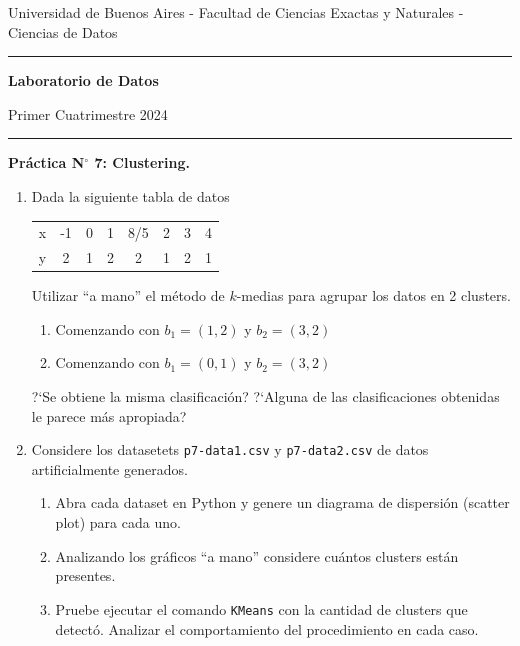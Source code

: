 \documentclass[a4paper,11pt]{article}
\theoremstyle{definition}
\begin{document}
\centerline{{\small Universidad de Buenos Aires - Facultad de Ciencias Exactas y Naturales - Ciencias de Datos}}

\vskip 0.2cm

\hrule

\vskip 0.2cm

 \centerline{{\bf\Large{\sc Laboratorio de Datos}}}

 \vskip 0.2cm

 \centerline{\ttfamily Primer Cuatrimestre 2024}

\vskip 0.2cm

 \hrule

 \bigskip
 \centerline{\bf Práctica N$^\circ$ 7: Clustering.}
 \bigskip

\begin{enumerate}
\item Dada la siguiente tabla de datos
\begin{table}[h]
\begin{center}
\begin{tabular}{|c|c|c|c|c|c|c|c|}
\hline
x & -1 & 0 & 1 & 8/5 & 2 & 3 & 4  \\
y  & 2 & 1& 2& 2& 1& 2 & 1 \\
\hline
\end{tabular}
\end{center}
\end{table}

Utilizar ``a mano'' el m\'etodo de $k$-medias para agrupar los datos en 2 clusters.
\begin{enumerate}
\item Comenzando con $b_1 =(1,2)  $ y $b_2=(3,2)  $
\item Comenzando con $b_1=(0,1)   $ y $b_2= (3,2) $
\end{enumerate}

?`Se obtiene la misma clasificaci\'on? ?`Alguna de las clasificaciones obtenidas le parece m\'as apropiada?

\item Considere los datasetets \texttt{p7-data1.csv} y \texttt{p7-data2.csv} de datos artificialmente generados.

\begin{enumerate}
	\item Abra cada dataset en Python y genere un diagrama de dispersi\'on (scatter plot) para cada uno.
	\item Analizando los gr\'aficos ``a mano'' considere cu\'antos clusters est\'an presentes.
	\item Pruebe ejecutar el comando \texttt{KMeans} con la cantidad de clusters que detect\'o. Analizar el comportamiento del procedimiento en cada caso.
	

\end{enumerate}
\end{enumerate}
\end{document}
